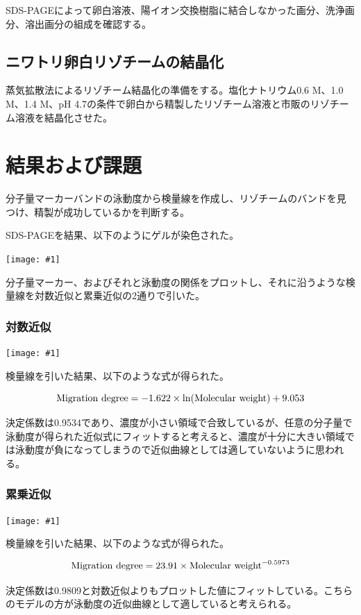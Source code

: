 \documentclass[a4paper,papersize,dvipdfmx]{jsarticle}
\newcommand{\pict}[2]{\begin{center} \texttt{[image: \#1]} \end{center}}   %
\begin{document}
SDS-PAGEによって卵白溶液、陽イオン交換樹脂に結合しなかった画分、洗浄画分、溶出画分の組成を確認する。


\subsection*{ニワトリ卵白リゾチームの結晶化}
蒸気拡散法によるリゾチーム結晶化の準備をする。塩化ナトリウム0.6 M、1.0 M、1.4 M、pH 4.7の条件で卵白から精製したリゾチーム溶液と市販のリゾチーム溶液を結晶化させた。

\section*{結果および課題}
\begin{tcolorbox}[colback=white,colbacktitle=black,coltitle=white,title={(1)}]
分子量マーカーバンドの泳動度から検量線を作成し、リゾチームのバンドを見つけ、精製が成功しているかを判断する。
\end{tcolorbox}

SDS-PAGEを結果、以下のようにゲルが染色された。

\pict{imgs/row-gel.jpg}{4}

分子量マーカー、およびそれと泳動度の関係をプロットし、それに沿うような検量線を対数近似と累乗近似の2通りで引いた。

\subsubsection*{対数近似}
\pict{imgs/gel.png}{8}

検量線を引いた結果、以下のような式が得られた。

\[\rm{Migration \ degree} = -1.622 \times \ln(\rm{Molecular \ weight}) + 9.053\]

決定係数は0.9534であり、濃度が小さい領域で合致しているが、任意の分子量で泳動度が得られた近似式にフィットすると考えると、濃度が十分に大きい領域では泳動度が負になってしまうので近似曲線としては適していないように思われる。

\subsubsection*{累乗近似}
\pict{imgs/gel-2.png}{8}

検量線を引いた結果、以下のような式が得られた。

\[\rm{Migration \ degree} = 23.91 \times \rm{Molecular \ weight}^{-0.5973}\]

決定係数は0.9809と対数近似よりもプロットした値にフィットしている。こちらのモデルの方が泳動度の近似曲線として適していると考えられる。
\end{document}
